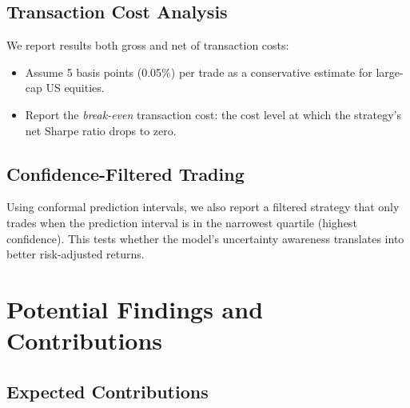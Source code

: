 \documentclass[11pt,a4paper]{article}
\begin{document}
\subsection{Transaction Cost Analysis}

We report results both gross and net of transaction costs:
\begin{itemize}[nosep]
    \item Assume 5 basis points (0.05\%) per trade as a conservative estimate for large-cap US equities.
    \item Report the \emph{break-even} transaction cost: the cost level at which the strategy's net Sharpe ratio drops to zero.
\end{itemize}

\subsection{Confidence-Filtered Trading}

Using conformal prediction intervals, we also report a filtered strategy that only trades when the prediction interval is in the narrowest quartile (highest confidence). This tests whether the model's uncertainty awareness translates into better risk-adjusted returns.


\section{Potential Findings and Contributions}

\subsection{Expected Contributions}
\end{document}
